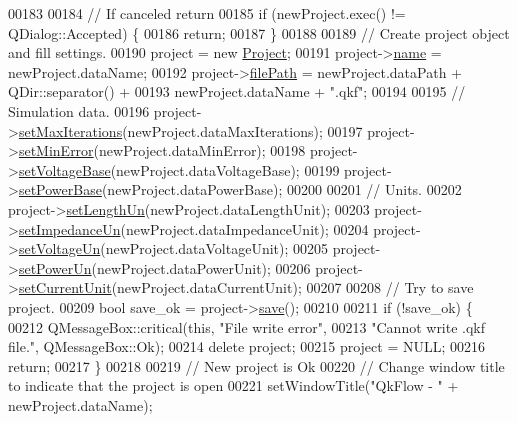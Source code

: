 \begin{DoxyCode}
00183 
00184   \textcolor{comment}{// If canceled return}
00185   \textcolor{keywordflow}{if} (newProject.exec() != QDialog::Accepted) \{
00186     \textcolor{keywordflow}{return};
00187   \}
00188 
00189   \textcolor{comment}{// Create project object and fill settings.}
00190   project = \textcolor{keyword}{new} \hyperlink{class_project}{Project};
00191   project->\hyperlink{class_project_a82dd2d1bc38f9fd08c9a811fcaa76b38}{name} = newProject.dataName;
00192   project->\hyperlink{class_project_a79f30adcefd0b72bd4ac7db724bc9531}{filePath} = newProject.dataPath + QDir::separator() +
00193                       newProject.dataName + \textcolor{stringliteral}{".qkf"};
00194 
00195   \textcolor{comment}{// Simulation data.}
00196   project->\hyperlink{class_project_abac6e194d2d16fbdbe51627844eae60b}{setMaxIterations}(newProject.dataMaxIterations);
00197   project->\hyperlink{class_project_a2cb776c39adb42a1113bf7887d0d4636}{setMinError}(newProject.dataMinError);
00198   project->\hyperlink{class_project_a494c3e89851f754188c7abaedbf77ef6}{setVoltageBase}(newProject.dataVoltageBase);
00199   project->\hyperlink{class_project_abb4df805b3cd3af509a41e657eb4bb83}{setPowerBase}(newProject.dataPowerBase);
00200 
00201   \textcolor{comment}{// Units.}
00202   project->\hyperlink{class_project_a846ee2284b0856d461b35d78d9f8e1d6}{setLengthUn}(newProject.dataLengthUnit);
00203   project->\hyperlink{class_project_a995d050781923522ae2a02728346d199}{setImpedanceUn}(newProject.dataImpedanceUnit);
00204   project->\hyperlink{class_project_aa26b488b2e93c8a8c6b4423ce07df4a1}{setVoltageUn}(newProject.dataVoltageUnit);
00205   project->\hyperlink{class_project_aa46b8645d2047c1a2e8d329b9ebbc120}{setPowerUn}(newProject.dataPowerUnit);
00206   project->\hyperlink{class_project_a64d9800bc3acafcfa4d3f45ee5aacc6d}{setCurrentUnit}(newProject.dataCurrentUnit);
00207 
00208   \textcolor{comment}{// Try to save project.}
00209   \textcolor{keywordtype}{bool} save\_ok = project->\hyperlink{class_project_a596a875bc5be73bc5b1b71b6448c1e07}{save}();
00210 
00211   \textcolor{keywordflow}{if} (!save\_ok) \{
00212     QMessageBox::critical(\textcolor{keyword}{this}, \textcolor{stringliteral}{"File write error"},
00213                           \textcolor{stringliteral}{"Cannot write .qkf file."}, QMessageBox::Ok);
00214     \textcolor{keyword}{delete} project;
00215     project = NULL;
00216     \textcolor{keywordflow}{return};
00217   \}
00218 
00219   \textcolor{comment}{// New project is Ok}
00220   \textcolor{comment}{// Change window title to indicate that the project is open}
00221   setWindowTitle(\textcolor{stringliteral}{"QkFlow - "} + newProject.dataName);

\end{DoxyCode}
